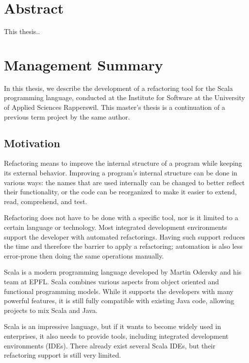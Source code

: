 \documentclass[10pt,a4paper,oneside]{scrreprt}
\begin{document}
\newcommand{\subtitlename}{Master's Thesis}
\newcommand{\titlename}{Scala Refactoring}



\emptypage

\chapter*{Abstract}


This thesis..


\chapter*{Management Summary}

In this thesis, we describe the development of a refactoring tool for the Scala programming language, conducted at the Institute for Software at the University of Applied Sciences Rapperswil. This master's thesis is a continuation of a previous term project by the same author.

\section*{Motivation}

Refactoring means to improve the internal structure of a program while keeping its external behavior. Improving a program's internal structure can be done in various ways: the names that are used internally can be changed to better reflect their functionality, or the code can be reorganized to make it easier to extend, read, comprehend, and test. 

Refactoring does not have to be done with a specific tool, nor is it limited to a certain language or technology. Most integrated development environments support the developer with automated refactorings. Having such support reduces the time and therefore the barrier to apply a refactoring; automation is also less error-prone then doing the same operations manually.

Scala is a modern programming language developed by Martin Odersky and his team at EPFL. Scala combines various aspects from object oriented and functional programming models. While it supports the developers with many powerful features, it is still fully compatible with existing Java code, allowing projects to mix Scala and Java.

Scala is an impressive language, but if it wants to become widely used in enterprises, it also needs to provide tools, including integrated development environments (IDEs). There already exist several Scala IDEs, but their refactoring support is still very limited.
\end{document}
